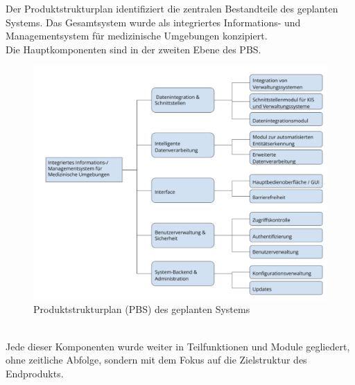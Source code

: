 Der Produktstrukturplan identifiziert die zentralen Bestandteile des geplanten Systems. Das Gesamtsystem wurde als integriertes Informations- und Managementsystem für medizinische Umgebungen konzipiert.\\
Die Hauptkomponenten sind in der zweiten Ebene des PBS.
\begin{figure}[ht]
	\centering
	\includegraphics[width=1\textwidth]{fig/planung_alle_ebenen.png}
	\caption{Produktstrukturplan (PBS) des geplanten Systems}
	\label{fig:produktstrukturplan}
\end{figure}
\\
Jede dieser Komponenten wurde weiter in Teilfunktionen und Module gegliedert, ohne zeitliche Abfolge, sondern mit dem Fokus auf die Zielstruktur des Endprodukts.

\pagebreak
